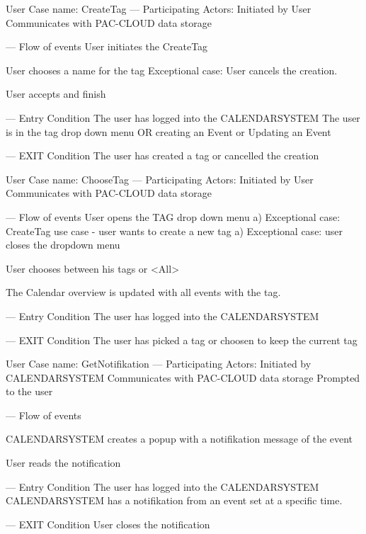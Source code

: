 User Case name: CreateTag
---
Participating Actors:
Initiated by User
Communicates with PAC-CLOUD data storage

---
Flow of events
User initiates the CreateTag

User chooses a name for the tag
	Exceptional case: User cancels the creation.

User accepts and finish

---
Entry Condition
The user has logged into the CALENDARSYSTEM
The user is in the tag drop down menu OR creating an Event or Updating an Event

---
EXIT Condition
The user has created a tag or cancelled the creation



User Case name: ChooseTag
---
Participating Actors:
Initiated by User
Communicates with PAC-CLOUD data storage

---
Flow of events
User opens the TAG drop down menu
	a) Exceptional case: CreateTag use case - user wants to create a new tag
	a) Exceptional case: user closes the dropdown menu

User chooses between his tags or <All>
	
The Calendar overview is updated with all events with the tag.

---
Entry Condition
The user has logged into the CALENDARSYSTEM

---
EXIT Condition
The user has picked a tag or choosen to keep the current tag



User Case name: GetNotifikation
---
Participating Actors:
Initiated by CALENDARSYSTEM
Communicates with PAC-CLOUD data storage
Prompted to the user

---
Flow of events

CALENDARSYSTEM creates a popup with a notifikation message of the event

User reads the notification

---
Entry Condition
The user has logged into the CALENDARSYSTEM
CALENDARSYSTEM has a notifikation from an event set at a specific time.

---
EXIT Condition
User closes the notification